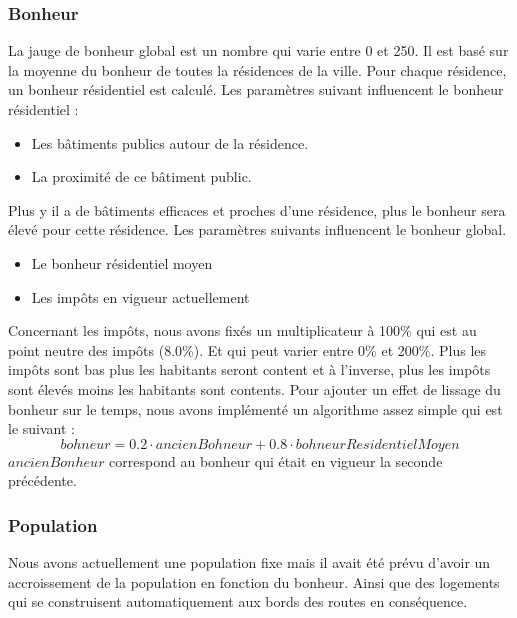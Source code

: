 \documentclass[a4paper,10pt,openany,oneside]{report}
\begin{document}
\subsubsection{Bonheur}
La jauge de bonheur global est un nombre qui varie entre 0 et 250. Il est basé sur la moyenne du bonheur de toutes la résidences de la ville. 
\newline
Pour chaque résidence, un bonheur résidentiel est calculé.
Les paramètres suivant influencent le bonheur résidentiel :
\begin{itemize}
	\item Les bâtiments publics autour de la résidence.
	\item La proximité de ce bâtiment public.
\end{itemize}
Plus y il a de bâtiments efficaces et proches d'une résidence, plus le bonheur sera élevé pour cette résidence.
Les paramètres suivants influencent le bonheur global.
\begin{itemize}
	\item Le bonheur résidentiel moyen
	\item Les impôts en vigueur actuellement
\end{itemize}
Concernant les impôts, nous avons fixés un multiplicateur à 100\% qui est au point neutre des impôts (8.0\%). Et qui peut varier entre 0\% et 200\%. Plus les impôts sont bas plus les habitants seront content et à l'inverse, plus les impôts sont élevés moins les habitants sont contents.
\newline
Pour ajouter un effet de lissage du bonheur sur le temps, nous avons implémenté un algorithme assez simple qui est le suivant :
\[bohneur = 0.2 \cdot ancienBohneur + 0.8 \cdot bohneurResidentielMoyen\]
$ancienBonheur$ correspond au bonheur qui était en vigueur la seconde précédente.

\subsubsection{Population}
Nous avons actuellement une population fixe mais il avait été prévu d'avoir un accroissement de la population en fonction du bonheur. Ainsi que des logements qui se construisent automatiquement aux bords des routes en conséquence.
\end{document}
